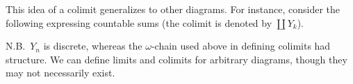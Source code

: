 This idea of a colimit generalizes to other diagrams. For instance, consider the
following expressing countable sums (the colimit is denoted by $\coprod Y_k$).
\begin{center}
\end{center}

N.B.~$Y_n$ is discrete, whereas the $\omega$-chain used above in defining
colimits had structure. We can define limits and colimits for arbitrary
diagrams, though they may not necessarily exist.
